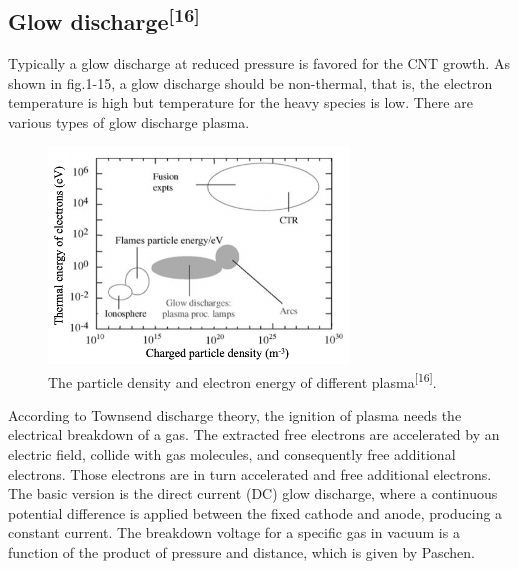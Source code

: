 \subsection{Glow discharge\textsuperscript{[16]}}
Typically a glow discharge at reduced pressure is favored for the CNT growth.  As shown in fig.1-15, a glow discharge should be non-thermal, that is, the electron temperature is high but temperature for the heavy species is low.  There are various types of glow discharge plasma. 
\begin{figure}[h]
\centering
\includegraphics[width=8cm]{src/fig/fig15.png}
\caption{The particle density and electron energy of different plasma\textsuperscript{[16]}.}
\end{figure}
According to Townsend discharge theory, the ignition of plasma needs the electrical breakdown of a gas. The extracted free electrons are accelerated by an electric field, collide with gas molecules, and consequently free additional electrons. Those electrons are in turn accelerated and free additional electrons. The basic version is the direct current (DC) glow discharge, where a continuous potential difference is applied between the fixed cathode and anode, producing a constant current. The breakdown voltage for a specific gas in vacuum is a function of the product of  pressure and distance, which is given by Paschen. 
